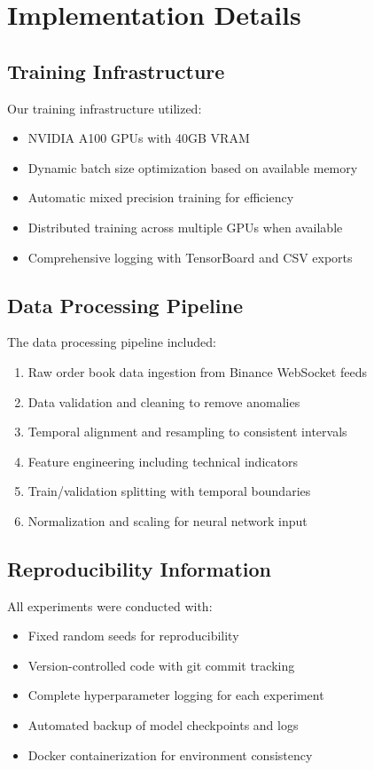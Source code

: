 \documentclass[conference]{IEEEtran}
\begin{document}
\section{Implementation Details}

\subsection{Training Infrastructure}

Our training infrastructure utilized:
\begin{itemize}
\item NVIDIA A100 GPUs with 40GB VRAM
\item Dynamic batch size optimization based on available memory
\item Automatic mixed precision training for efficiency
\item Distributed training across multiple GPUs when available
\item Comprehensive logging with TensorBoard and CSV exports
\end{itemize}

\subsection{Data Processing Pipeline}

The data processing pipeline included:
\begin{enumerate}
\item Raw order book data ingestion from Binance WebSocket feeds
\item Data validation and cleaning to remove anomalies
\item Temporal alignment and resampling to consistent intervals
\item Feature engineering including technical indicators
\item Train/validation splitting with temporal boundaries
\item Normalization and scaling for neural network input
\end{enumerate}

\subsection{Reproducibility Information}

All experiments were conducted with:
\begin{itemize}
\item Fixed random seeds for reproducibility
\item Version-controlled code with git commit tracking
\item Complete hyperparameter logging for each experiment
\item Automated backup of model checkpoints and logs
\item Docker containerization for environment consistency
\end{itemize}
\end{document}
